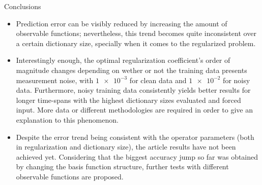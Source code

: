\documentclass{beamer}
\begin{document}
\begin{frame}[allowframebreaks]{Conclusions}
    \begin{itemize}
        \item Prediction error can be visibly reduced by increasing the amount of observable functions; nevertheless, this trend becomes quite inconsistent over a certain dictionary size, specially when it comes to the regularized problem.
        \item Interestingly enough, the optimal regularization coefficient's order of magnitude changes depending on wether or not the training data presents measurement noise, with $\num{1e-3}$ for clean data and $\num{1e-2}$ for noisy data. Furthermore, noisy training data consistently yields better results for longer time-spans with the highest dictionary sizes evaluated and forced input. More data or different methodologies are required in order to give an explanation to this phenomenon.
        \item Despite the error trend being consistent with the operator parameters (both in regularization and dictionary size), the article results have not been achieved yet. Considering that the biggest accuracy jump so far was obtained by changing the basis function structure, further tests with different observable functions are proposed.
    \end{itemize}
\end{frame}
\end{document}
